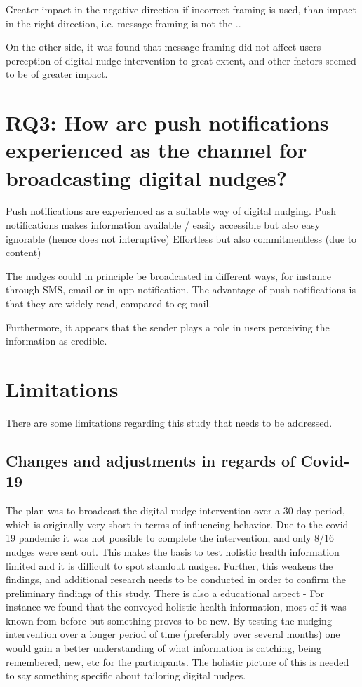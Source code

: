 Greater impact in the negative direction if incorrect framing is used, than impact in the right direction, i.e. message framing is not the ..

On the other side, it was found that message framing did not affect users perception of digital nudge intervention to great extent, and other factors seemed to be of greater impact. 


\section{RQ3: How are push notifications experienced as the channel for broadcasting digital nudges?}

Push notifications are experienced as a suitable way of digital nudging. 
Push notifications makes information available / easily accessible but also easy ignorable (hence does not interuptive)  
Effortless but also commitmentless (due to content)

The nudges could in principle be broadcasted in different ways, for instance through SMS, email or in app notification. The advantage of push notifications is that they are widely read, compared to eg mail.

Furthermore, it appears that the sender plays a role in users perceiving the information as credible.

\section{Limitations}
There are some limitations regarding this study that needs to be addressed.

\subsection{Changes and adjustments in regards of Covid-19 }
The plan was to broadcast the digital nudge intervention over a 30 day period, which is originally very short in terms of influencing behavior. Due to the covid-19 pandemic it was not possible to complete the intervention, and only 8/16 nudges were sent out. This makes the basis to test holistic health information limited and it is difficult to spot standout nudges. Further, this weakens the findings, and additional research needs to be conducted in order to confirm the preliminary findings of this study. There is also a educational aspect - For instance we found that the conveyed holistic health information, most of it was known from before but something proves to be new. By testing the nudging intervention over a longer period of time (preferably over several months) one would gain a better understanding of what information is catching, being remembered, new, etc for the participants. The holistic picture of this is needed to say something specific about tailoring digital nudges. 

